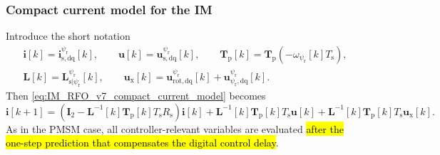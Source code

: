 \begin{frame}
    \frametitle{Compact current model for the IM}
    Introduce the short notation
    \begin{equation}
        \begin{gathered}
            \bm{i}[k]=\bm{i}^{\psi_\mathrm{r}}_{\mathrm{s},\mathrm{dq}}[k],\qquad
            \bm{u}[k]=\bm{u}^{\psi_\mathrm{r}}_{\mathrm{s},\mathrm{dq}}[k],\qquad
            \bm{T}_{\mathrm{p}}[k]=\bm{T}_\mathrm{p}(-\omega_{\psi_\mathrm{r}}[k]T_\mathrm{s}),\\
            \bm{L}[k]=\bm{L}^{\psi_\mathrm{r}}_{\mathrm{s}|\psi_\mathrm{r}}[k],
            \qquad
            \bm{u}_\mathrm{x}[k]=\bm{u}^{\psi_\mathrm{r}}_{\mathrm{rot},\mathrm{dq}}[k]+\bm{u}^{\psi_\mathrm{r}}_{\psi_\mathrm{r},\mathrm{dq}}[k].
        \end{gathered}
        \label{eq:IM_current_control_short_notation}
    \end{equation}\pause%
    Then \eqref{eq:IM_RFO_v7_compact_current_model} becomes
    \begin{equation}
        \bm{i}[k+1]
        =\left(\bm{I}_2-\bm{L}^{-1}[k]\bm{T}_{\mathrm{p}}[k]T_\mathrm{s}R_\mathrm{s}\right)\bm{i}[k]
        +\bm{L}^{-1}[k]\bm{T}_{\mathrm{p}}[k]T_\mathrm{s}\bm{u}[k]
        +\bm{L}^{-1}[k]\bm{T}_{\mathrm{p}}[k]T_\mathrm{s}\bm{u}_\mathrm{x}[k].
        \label{eq:IM_current_control_qLPV_plant}
    \end{equation}\pause%
    As in the PMSM case, all controller-relevant variables are evaluated \hl{after the one-step prediction that compensates the digital control delay}.
\end{frame}

